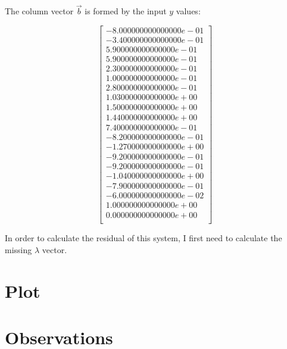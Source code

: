 \documentclass{article}
\begin{document}
The column vector $\vec{b}$ is formed by the input $y$ values:

$$
\begin{bmatrix} 
-8.000000000000000e-01\\
-3.400000000000000e-01\\
5.900000000000000e-01\\
5.900000000000000e-01\\
2.300000000000000e-01\\
1.000000000000000e-01\\
2.800000000000000e-01\\
1.030000000000000e+00\\
1.500000000000000e+00\\
1.440000000000000e+00\\
7.400000000000000e-01\\
-8.200000000000000e-01\\
-1.270000000000000e+00\\
-9.200000000000000e-01\\
-9.200000000000000e-01\\
-1.040000000000000e+00\\
-7.900000000000000e-01\\
-6.000000000000000e-02\\
1.000000000000000e+00\\
0.000000000000000e+00\\
\end{bmatrix}
$$

In order to calculate the residual of this system, I first need to calculate the missing $\lambda$ vector.

\section{Plot}
\section{Observations}
\end{document}
